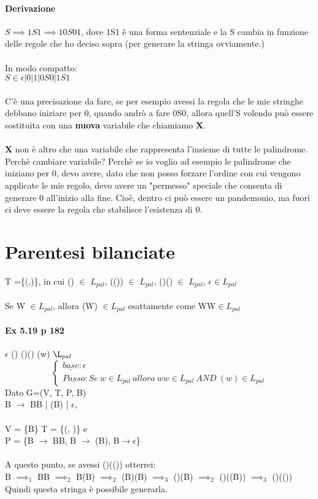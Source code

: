 \documentclass[12pt, a4paper, openany, oneside]{book}
\begin{document}
\paragraph{Derivazione}
$S \implies 1S1 \implies 10S01$, dove 1S1 è una forma sentenziale e la S cambia in
funzione delle regole che ho deciso sopra (per generare la stringa ovviamente.)
\\ \\ In modo compatto: \\
$S \in \epsilon | 0 | 1 | 0S0 | 1S1$
\\ \\
C'è una precisazione da fare, se per esempio avessi la regola che le mie stringhe
debbano iniziare per 0, quando andrò a fare 0S0, allora quell'S volendo può
essere sostituita con una \textbf{nuova} variabile che chiamiamo \textbf{X}. \\ \\
\textbf{X} non è altro che una variabile che rappresenta l'insieme di tutte le
palindrome.
Perchè cambiare variabile? Perchè se io voglio ad esempio le palindrome che 
iniziano per 0, devo avere, dato che non posso forzare l'ordine con cui vengono
applicate le mie regolo, devo avere un "permesso" speciale che consenta di 
generare 0 all'inizio alla fine. Cioè, dentro ci può essere un pandemonio, ma 
fuori ci deve essere la regola che stabilisce l'esistenza di 0.
\section{Parentesi bilanciate}
T =\{(,)\}, in cui () $\in$ $L_{pal}$, (()) $\in$ $L_{pal}$, ()() $\in$ $L_{pal}$,
$\epsilon \in L_{pal}$ \\ \\
Se W $\in L_{pal}$, allora (W) $\in L_{pal}$ esattamente come WW$\in L_{pal}$
\paragraph{Ex 5.19 p 182}
$\epsilon$ ()  ()() (w) $\L_{pal}$
$$\begin{cases}
	\underline{base}: \epsilon	\\
	\underline{Passo}: Se~w\in L_{pal} ~ allora ~ ww\in L_{pal} 
	 ~AND~ (w)\in L_{pal} 
\end{cases}$$
Dato G=(V, T, P, B) \\
B $\to$ BB | (B) | $\epsilon$, \\ \\
V = \{B\} T = \{(, )\} e \\
P = \{B $\to$ BB, B $\to$ (B), B$\to \epsilon$\} \\ \\
A questo punto, se avessi ()(()) otterrei: \\
B $\implies _{1}$ BB $\implies _{2}$ B(B) $\implies _{2}$ (B)(B) $\implies _{3}$
()(B) $\implies _{2}$ ()((B)) $\implies _{3}$ ()(()) \\
Quindi questa stringa è possibile generarla.
\end{document}
